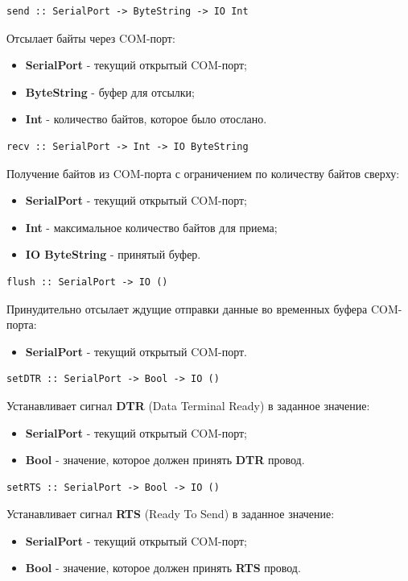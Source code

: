 \documentclass[russian,utf8,simple,emptystyle]{eskdtext}
\begin{document}
\begin{lstlisting}
send :: SerialPort -> ByteString -> IO Int
\end{lstlisting}
Отсылает байты через COM-порт:
\begin{itemize}
\item \textbf{SerialPort} - текущий открытый COM-порт;
\item \textbf{ByteString} - буфер для отсылки;
\item \textbf{Int} - количество байтов, которое было отослано.
\end{itemize}

\begin{lstlisting}
recv :: SerialPort -> Int -> IO ByteString
\end{lstlisting}
Получение байтов из COM-порта с ограничением по количеству байтов сверху:
\begin{itemize}
\item \textbf{SerialPort} - текущий открытый COM-порт;
\item \textbf{Int} - максимальное количество байтов для приема;
\item \textbf{IO ByteString} - принятый буфер.
\end{itemize}

\begin{lstlisting}
flush :: SerialPort -> IO ()
\end{lstlisting}
Принудительно отсылает ждущие отправки данные во временных буфера COM-порта:
\begin{itemize}
\item \textbf{SerialPort} - текущий открытый COM-порт.
\end{itemize}

\begin{lstlisting}
setDTR :: SerialPort -> Bool -> IO ()
\end{lstlisting}
Устанавливает сигнал \textbf{DTR} (Data Terminal Ready) в заданное значение:
\begin{itemize}
\item \textbf{SerialPort} - текущий открытый COM-порт;
\item \textbf{Bool} - значение, которое должен принять \textbf{DTR} провод.
\end{itemize}

\begin{lstlisting}
setRTS :: SerialPort -> Bool -> IO ()
\end{lstlisting}
Устанавливает сигнал \textbf{RTS} (Ready To Send) в заданное значение:
\begin{itemize}
\item \textbf{SerialPort} - текущий открытый COM-порт;
\item \textbf{Bool} - значение, которое должен принять \textbf{RTS} провод.
\end{itemize}
\end{document}
